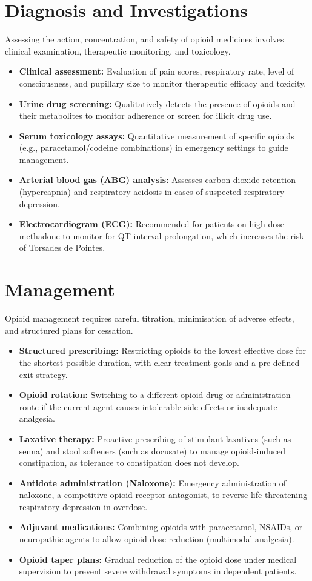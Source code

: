 \section*{Diagnosis and Investigations}
Assessing the action, concentration, and safety of opioid medicines involves clinical examination, therapeutic monitoring, and toxicology.
\begin{itemize}
    \item \textbf{Clinical assessment:} Evaluation of pain scores, respiratory rate, level of consciousness, and pupillary size to monitor therapeutic efficacy and toxicity.
    \item \textbf{Urine drug screening:} Qualitatively detects the presence of opioids and their metabolites to monitor adherence or screen for illicit drug use.
    \item \textbf{Serum toxicology assays:} Quantitative measurement of specific opioids (e.g., paracetamol/codeine combinations) in emergency settings to guide management.
    \item \textbf{Arterial blood gas (ABG) analysis:} Assesses carbon dioxide retention (hypercapnia) and respiratory acidosis in cases of suspected respiratory depression.
    \item \textbf{Electrocardiogram (ECG):} Recommended for patients on high-dose methadone to monitor for QT interval prolongation, which increases the risk of Torsades de Pointes.
\end{itemize}

\section*{Management}
Opioid management requires careful titration, minimisation of adverse effects, and structured plans for cessation.
\begin{itemize}
    \item \textbf{Structured prescribing:} Restricting opioids to the lowest effective dose for the shortest possible duration, with clear treatment goals and a pre-defined exit strategy.
    \item \textbf{Opioid rotation:} Switching to a different opioid drug or administration route if the current agent causes intolerable side effects or inadequate analgesia.
    \item \textbf{Laxative therapy:} Proactive prescribing of stimulant laxatives (such as senna) and stool softeners (such as docusate) to manage opioid-induced constipation, as tolerance to constipation does not develop.
    \item \textbf{Antidote administration (Naloxone):} Emergency administration of naloxone, a competitive opioid receptor antagonist, to reverse life-threatening respiratory depression in overdose.
    \item \textbf{Adjuvant medications:} Combining opioids with paracetamol, NSAIDs, or neuropathic agents to allow opioid dose reduction (multimodal analgesia).
    \item \textbf{Opioid taper plans:} Gradual reduction of the opioid dose under medical supervision to prevent severe withdrawal symptoms in dependent patients.
\end{itemize}

